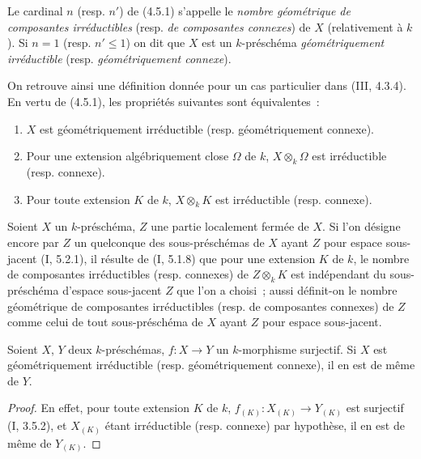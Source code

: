 \begin{definition}[4.5.2]
\label{IV.2.4.5.2-fr}
Le cardinal $n$ (resp. $n'$) de (4.5.1) s'appelle le \emph{nombre géométrique
de composantes irréductibles} (resp. \emph{de composantes connexes}) de $X$
(relativement à $k$). Si $n=1$ (resp. $n'\leqslant1$) on dit que $X$ est un
$k$-préschéma \emph{géométriquement irréductible} (resp. \emph{géométriquement
connexe}).
\end{definition}

On retrouve ainsi une définition donnée pour un cas particulier dans
(III, 4.3.4). En vertu de (4.5.1), les propriétés suivantes sont
équivalentes~:
\begin{enumerate}
\item[$a)$] $X$ est géométriquement irréductible (resp. géométriquement
connexe).
\item[$b)$] Pour une extension algébriquement close $\Omega$ de $k$,
$X\otimes_k\Omega$ est irréductible (resp. connexe).
\item[$c)$] Pour toute extension $K$ de $k$, $X\otimes_k K$ est irréductible
(resp. connexe).
\end{enumerate}

\begin{env}[4.5.3]
\label{IV.2.4.5.3-fr}
Soient $X$ un $k$-préschéma, $Z$ une partie localement fermée de $X$. Si l'on
désigne encore par $Z$ un quelconque des sous-préschémas de $X$ ayant $Z$ pour
espace sous-jacent (I, 5.2.1), il résulte de (I, 5.1.8) que pour une extension
$K$ de $k$, le nombre de composantes irréductibles (resp. connexes) de
$Z\otimes_k K$ est indépendant du sous-préschéma d'espace sous-jacent $Z$ que
l'on a choisi~; aussi définit-on le nombre géométrique de composantes
irréductibles (resp. de composantes connexes) de $Z$ comme celui de tout
sous-préschéma de $X$ ayant $Z$ pour espace sous-jacent.
\end{env}

\begin{proposition}[4.5.4]
\label{IV.2.4.5.4-fr}
Soient $X$, $Y$ deux $k$-préschémas, $f:X\to Y$ un $k$-morphisme surjectif.
Si $X$ est géométriquement irréductible (resp. géométriquement connexe), il en
est de même de $Y$.
\end{proposition}


\begin{proof}
En effet, pour toute extension $K$ de $k$, $f_{(K)}:X_{(K)}\to Y_{(K)}$ est
surjectif (I, 3.5.2), et $X_{(K)}$ étant irréductible (resp. connexe) par
hypothèse, il en est de même de $Y_{(K)}$.
\end{proof}

